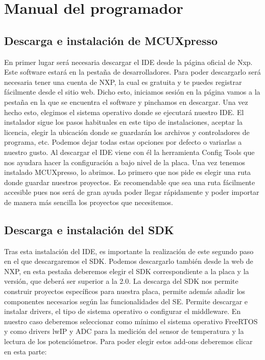 \section{Manual del programador}
\subsection{Descarga e instalación de MCUXpresso}
En primer lugar será necesaria descargar el IDE desde la página oficial de Nxp. Este software estará en la pestaña de desarrolladores. Para poder descargarlo será necesaria tener una cuenta de NXP, la cual es gratuita y te puedes registrar fácilmente desde el sitio web.
Dicho esto, iniciamos sesión en la página vamos a la pestaña en la que se encuentra el software y pinchamos en descargar. Una vez hecho esto, elegimos el sistema operativo donde se ejecutará nuestro IDE. El instalador sigue los pasos habituales en este tipo de instalaciones, aceptar la licencia, elegir la ubicación donde se guardarán los archivos y controladores de programa, etc. Podemos dejar todas estas opciones por defecto o variarlas a nuestro gusto. Al descargar el IDE viene con él la herramienta Config Tools que nos ayudara hacer la configuración a bajo nivel de la placa. Una vez tenemos instalado MCUXpresso, lo abrimos. Lo primero que nos pide es elegir una ruta donde guardar nuestros proyectos. Es recomendable que sea una ruta fácilmente accesible pues nos será de gran ayuda poder llegar rápidamente y poder importar de manera más sencilla los proyectos que necesitemos.
\imagen{}{}

\subsection{Descarga e instalación del SDK}
Tras esta instalación del IDE, es importante la realización de este segundo paso en el que descargaremos el SDK. Podemos descargarlo también desde la web de NXP, en esta pestaña deberemos elegir el SDK correspondiente a la placa y la versión, que deberá ser superior a la 2.0. 
La descarga del SDK nos permite construir proyectos específicos para nuestra placa, permite además añadir los componentes necesarios según las funcionalidades del SE. Permite descargar e instalar drivers, el tipo de sistema operativo o configurar el middleware. En nuestro caso deberemos seleccionar como mínimo el sistema operativo FreeRTOS y como drivers lwIP y ADC para la medición del sensor de temperatura y la lectura de los potenciómetros. Para poder elegir estos add-ons deberemos clicar en esta parte:

